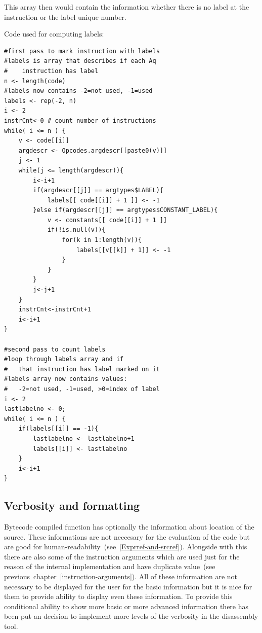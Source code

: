 \documentclass[thesis=M,english]{FITthesis}[2018/10/20]
\begin{document}
This array then would contain the information whether there is no label at the instruction or the label unique number.

Code used for computing labels:
\begin{lstlisting}
#first pass to mark instruction with labels
#labels is array that describes if each	Aq
#    instruction has label
n <- length(code)
#labels now contains -2=not used, -1=used
labels <- rep(-2, n)
i <- 2
instrCnt<-0 # count number of instructions
while( i <= n ) {
    v <- code[[i]]
    argdescr <- Opcodes.argdescr[[paste0(v)]]
    j <- 1
    while(j <= length(argdescr)){
        i<-i+1
        if(argdescr[[j]] == argtypes$LABEL){
            labels[[ code[[i]] + 1 ]] <- -1
        }else if(argdescr[[j]] == argtypes$CONSTANT_LABEL){
            v <- constants[[ code[[i]] + 1 ]]
            if(!is.null(v)){
                for(k in 1:length(v)){
                    labels[[v[[k]] + 1]] <- -1
                }
            }
        }
        j<-j+1
    }
    instrCnt<-instrCnt+1
    i<-i+1
}

#second pass to count labels
#loop through labels array and if
#   that instruction has label marked on it
#labels array now contains values:
#   -2=not used, -1=used, >0=index of label
i <- 2
lastlabelno <- 0;
while( i <= n ) {
    if(labels[[i]] == -1){
        lastlabelno <- lastlabelno+1
        labels[[i]] <- lastlabelno
    }
    i<-i+1
}
\end{lstlisting}

\subsection{Verbosity and formatting}

Bytecode compiled function has optionally the information about location of the source. These informations are not neccesary for the evaluation of the code but are good for human-readability~(see~\ref{Exprref-and-srcref}). Alongside with this there are also some of the instruction arguments which are used just for the reason of the internal implementation and have duplicate value~(see previous~chapter~\ref{instruction-arguments}). All of these information are not necessary to be displayed for the user for the basic information but it is nice for them to provide ability to display even these information. To provide this conditional ability to show more basic or more advanced information there has been put an decision to implement more levels of the verbosity in the disassembly tool.
\end{document}

